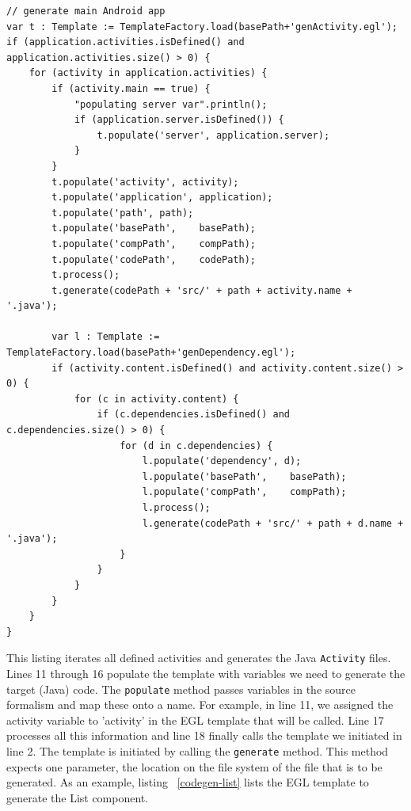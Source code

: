 \begin{lstlisting}[label=codegen-app,caption=Android code-generation, captionpos=t]
// generate main Android app
var t : Template := TemplateFactory.load(basePath+'genActivity.egl');
if (application.activities.isDefined() and application.activities.size() > 0) {
	for (activity in application.activities) {
		if (activity.main == true) {
			"populating server var".println();
			if (application.server.isDefined()) {
				t.populate('server', application.server);
			}
		}
		t.populate('activity', activity);
		t.populate('application', application);
		t.populate('path', path);
		t.populate('basePath',    basePath);
		t.populate('compPath',    compPath);
		t.populate('codePath',	  codePath);
		t.process();
		t.generate(codePath + 'src/' + path + activity.name + '.java');
	
		var l : Template := TemplateFactory.load(basePath+'genDependency.egl');
		if (activity.content.isDefined() and activity.content.size() > 0) {
			for (c in activity.content) {
				if (c.dependencies.isDefined() and c.dependencies.size() > 0) {
					for (d in c.dependencies) {
						l.populate('dependency', d);
						l.populate('basePath',    basePath);
						l.populate('compPath',    compPath);
						l.process();
						l.generate(codePath + 'src/' + path + d.name + '.java');
					}
				}
			}
		}
	}
}
\end{lstlisting}
This listing iterates all defined activities and generates the Java \texttt{Activity} files. Lines 11 through 16 populate the template with variables we need to generate the target (Java) code. The \texttt{populate} method passes variables in the source formalism and map these onto a name. For example, in line 11, we assigned the activity variable to 'activity' in the EGL template that will be called. Line 17 processes all this information and line 18 finally calls the template we initiated in line 2. The template is initiated by calling the \texttt{generate} method. This method expects one parameter, the location on the file system of the file that is to be generated. As an example, listing ~\ref{codegen-list} lists the EGL template to generate the List component.

